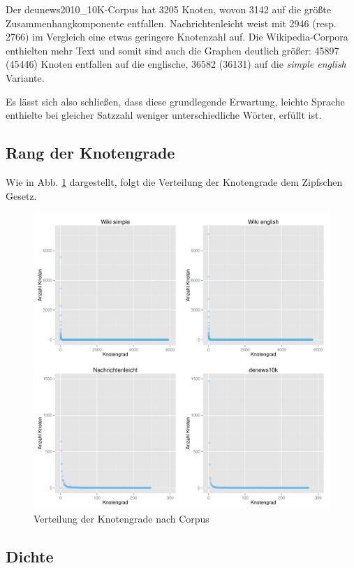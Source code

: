 \documentclass[11pt, a4paper]{article}
\begin{document}
Der deunews2010\_10K-Corpus hat 3205 Knoten, wovon 3142 auf die größte
Zusammenhangkomponente entfallen.
Nachrichtenleicht weist mit 2946 (resp. 2766) im Vergleich eine etwas geringere
Knotenzahl auf.
Die Wikipedia-Corpora enthielten mehr Text und somit sind auch die Graphen
deutlich größer: 45897 (45446) Knoten entfallen auf die englische, 36582 (36131)
auf die \emph{simple english} Variante.

Es l\"asst sich also schlie\ss{}en, dass diese grundlegende Erwartung,
leichte Sprache enthielte bei gleicher Satzzahl weniger unterschiedliche Wörter,
erf\"ullt ist.

\subsection{Rang der Knotengrade}

Wie in Abb. \ref{fig-vdeg} dargestellt, folgt die Verteilung der Knotengrade
dem Zipfschen Gesetz.

\begin{figure}[ht]
    \centering
        \includegraphics[scale=.5]{vdeg_plots.pdf}
    \caption{Verteilung der Knotengrade nach Corpus}
    \label{fig-vdeg}
\end{figure}


\subsection{Dichte}
\end{document}
